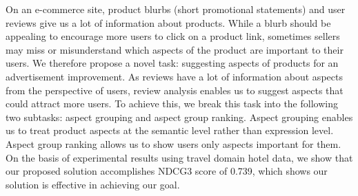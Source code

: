 On an e-commerce site, product blurbs (short promotional statements) and user reviews give us a lot of information about products. While a blurb should be appealing to encourage more users to click on a product link, sometimes sellers may miss or misunderstand which aspects of the product are important to their users. We therefore propose a novel task: suggesting aspects of products for an advertisement improvement. As reviews have a lot of information about aspects from the perspective of users, review analysis enables us to suggest aspects that could attract more users. To achieve this, we break this task into the following two subtasks: aspect grouping and aspect group ranking. Aspect grouping enables us to treat product aspects at the semantic level rather than expression level. Aspect group ranking allows us to show users only aspects important for them. On the basis of experimental results using travel domain hotel data, we show that our proposed solution accomplishes NDCG\@3 score of 0.739, which shows our solution is effective in achieving our goal.
